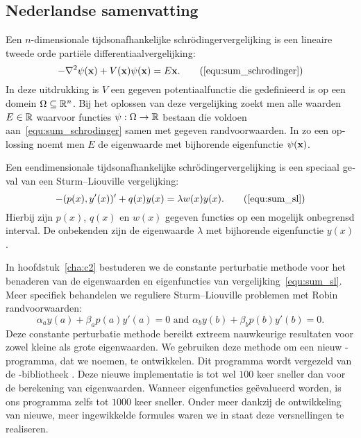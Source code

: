 \begin{otherlanguage}{dutch}
\section*{Nederlandse samenvatting}

Een $n$-dimensionale tijdsonafhankelijke schrödingervergelijking is een lineaire tweede orde partiële differentiaalvergelijking:
\begin{equation}
-\nabla^2 \psi(\vb{x}) + V(\vb{x}) \psi(\vb{x}) = E\vb{x}\text{.} \tag{\ref{equ:sum_schrodinger}}
\end{equation}
In deze uitdrukking is $V$ een gegeven potentiaalfunctie die gedefinieerd is op een domein $\Omega \subseteq \mathbb{R}^n$. Bij het oplossen van deze vergelijking zoekt men alle waarden $E\in \mathbb{R}$ waarvoor functies $\psi : \Omega \to \mathbb{R}$ bestaan die voldoen aan~\eqref{equ:sum_schrodinger} samen met gegeven randvoorwaarden. In zo een oplossing noemt men $E$ de eigenwaarde met bijhorende eigenfunctie $\psi(\vb{x})$.

Een eendimensionale tijdsonafhankelijke schrödingervergelijking is een speciaal geval van een Sturm--Liouville vergelijking:
\begin{equation}
    -(p(x), y'(x))' + q(x) y(x) = \lambda w(x) y(x) \text{.} \tag{\ref{equ:sum_sl}}
\end{equation}
Hierbij zijn $p(x)$, $q(x)$ en $w(x)$ gegeven functies op een mogelijk onbegrensd interval. De onbekenden zijn de eigenwaarde $\lambda$ met bijhorende eigenfunctie $y(x)$.

In hoofdstuk~\ref{cha:c2} bestuderen we de constante perturbatie methode voor het benaderen van de eigenwaarden en eigenfuncties van vergelijking~\eqref{equ:sum_sl}. Meer specifiek behandelen we reguliere Sturm--Liouville problemen met Robin randvoorwaarden:
$$
\alpha_a y(a) + \beta_a p(a) y'(a) = 0 \text{ and } \alpha_b y(b) + \beta_b p(b) y'(b) = 0\text{.}
$$
Deze constante perturbatie methode bereikt extreem nauwkeurige resultaten voor zowel kleine als grote eigenwaarden. We gebruiken deze methode om een nieuw \cpp{}-programma, dat we  noemen, te ontwikkelen. Dit programma wordt vergezeld van de \lpython{}-bibliotheek \pyslise{}. Deze nieuwe implementatie is tot wel $100$ keer sneller dan  voor de berekening van eigenwaarden. Wanneer eigenfuncties geëvalueerd worden, is ons programma zelfs tot $1000$ keer sneller. Onder meer dankzij de ontwikkeling van nieuwe, meer ingewikkelde formules waren we in staat deze versnellingen te realiseren. 


\end{otherlanguage}
